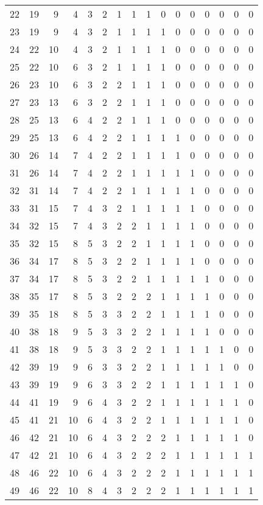 \documentclass[12pt]{article}
\begin{document}
\begin{tabular}{|r|r|r|r|r|r|r|r|r|r|r|r|r|r|r|r|}
22 & 19 &  9 &  4 & 3 & 2 & 1 & 1 & 1 & 0 & 0 & 0 & 0 & 0 & 0 & 0 \\
23 & 19 &  9 &  4 & 3 & 2 & 1 & 1 & 1 & 1 & 0 & 0 & 0 & 0 & 0 & 0 \\
24 & 22 & 10 &  4 & 3 & 2 & 1 & 1 & 1 & 1 & 0 & 0 & 0 & 0 & 0 & 0 \\
25 & 22 & 10 &  6 & 3 & 2 & 1 & 1 & 1 & 1 & 0 & 0 & 0 & 0 & 0 & 0 \\
26 & 23 & 10 &  6 & 3 & 2 & 2 & 1 & 1 & 1 & 0 & 0 & 0 & 0 & 0 & 0 \\
27 & 23 & 13 &  6 & 3 & 2 & 2 & 1 & 1 & 1 & 0 & 0 & 0 & 0 & 0 & 0 \\
28 & 25 & 13 &  6 & 4 & 2 & 2 & 1 & 1 & 1 & 0 & 0 & 0 & 0 & 0 & 0 \\
29 & 25 & 13 &  6 & 4 & 2 & 2 & 1 & 1 & 1 & 1 & 0 & 0 & 0 & 0 & 0 \\
30 & 26 & 14 &  7 & 4 & 2 & 2 & 1 & 1 & 1 & 1 & 0 & 0 & 0 & 0 & 0 \\
31 & 26 & 14 &  7 & 4 & 2 & 2 & 1 & 1 & 1 & 1 & 1 & 0 & 0 & 0 & 0 \\
32 & 31 & 14 &  7 & 4 & 2 & 2 & 1 & 1 & 1 & 1 & 1 & 0 & 0 & 0 & 0 \\
33 & 31 & 15 &  7 & 4 & 3 & 2 & 1 & 1 & 1 & 1 & 1 & 0 & 0 & 0 & 0 \\
34 & 32 & 15 &  7 & 4 & 3 & 2 & 2 & 1 & 1 & 1 & 1 & 0 & 0 & 0 & 0 \\
35 & 32 & 15 &  8 & 5 & 3 & 2 & 2 & 1 & 1 & 1 & 1 & 0 & 0 & 0 & 0 \\
36 & 34 & 17 &  8 & 5 & 3 & 2 & 2 & 1 & 1 & 1 & 1 & 0 & 0 & 0 & 0 \\
37 & 34 & 17 &  8 & 5 & 3 & 2 & 2 & 1 & 1 & 1 & 1 & 1 & 0 & 0 & 0 \\
38 & 35 & 17 &  8 & 5 & 3 & 2 & 2 & 2 & 1 & 1 & 1 & 1 & 0 & 0 & 0 \\
39 & 35 & 18 &  8 & 5 & 3 & 3 & 2 & 2 & 1 & 1 & 1 & 1 & 0 & 0 & 0 \\
40 & 38 & 18 &  9 & 5 & 3 & 3 & 2 & 2 & 1 & 1 & 1 & 1 & 0 & 0 & 0 \\
41 & 38 & 18 &  9 & 5 & 3 & 3 & 2 & 2 & 1 & 1 & 1 & 1 & 1 & 0 & 0 \\
42 & 39 & 19 &  9 & 6 & 3 & 3 & 2 & 2 & 1 & 1 & 1 & 1 & 1 & 0 & 0 \\
43 & 39 & 19 &  9 & 6 & 3 & 3 & 2 & 2 & 1 & 1 & 1 & 1 & 1 & 1 & 0 \\
44 & 41 & 19 &  9 & 6 & 4 & 3 & 2 & 2 & 1 & 1 & 1 & 1 & 1 & 1 & 0 \\
45 & 41 & 21 & 10 & 6 & 4 & 3 & 2 & 2 & 1 & 1 & 1 & 1 & 1 & 1 & 0 \\
46 & 42 & 21 & 10 & 6 & 4 & 3 & 2 & 2 & 2 & 1 & 1 & 1 & 1 & 1 & 0 \\
47 & 42 & 21 & 10 & 6 & 4 & 3 & 2 & 2 & 2 & 1 & 1 & 1 & 1 & 1 & 1 \\
48 & 46 & 22 & 10 & 6 & 4 & 3 & 2 & 2 & 2 & 1 & 1 & 1 & 1 & 1 & 1 \\
49 & 46 & 22 & 10 & 8 & 4 & 3 & 2 & 2 & 2 & 1 & 1 & 1 & 1 & 1 & 1 \\
\end{tabular}
\end{document}
